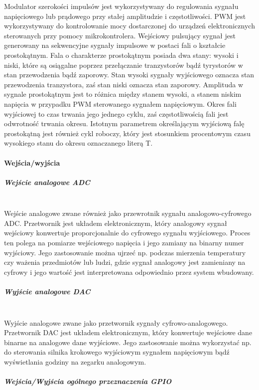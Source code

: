 \documentclass[12p]{article}
\begin{document}
Modulator szerokości impulsów jest wykorzystywany do regulowania sygnału napięciowego lub prądowego przy stałej amplitudzie i częstotliwości. PWM jest wykorzystywany do kontrolowanie mocy dostarczonej do urządzeń elektronicznych sterowanych przy pomocy mikrokontrolera. Wejściowy pulsujący sygnał jest generowany na sekwencyjne sygnały impulsowe w postaci fali o kształcie prostokątnym. Fala o charakterze prostokątnym posiada dwa stany: wysoki i niski, które są osiągalne poprzez przełączanie tranzystorów bądź tyrystorów w stan przewodzenia bądź zaporowy. Stan wysoki sygnały wyjściowego oznacza stan przewodzenia tranzystora, zaś stan niski oznacza stan zaporowy. Amplituda w sygnale prostokątnym jest to różnica między stanem wysoki, a stanem niskim napięcia w przypadku PWM sterowanego sygnałem napięciowym. Okres fali wyjściowej to czas trwania jego jednego cyklu, zaś częstotliwością fali jest odwrotność trwania okresu. Istotnym parametrem określającym wyjściową falę prostokątną jest również cykl roboczy, który jest stosunkiem procentowym czasu wysokiego stanu do okresu oznaczanego literą T.

\paragraph{Wejścia/wyjścia}
\subparagraph{Wejście analogowe ADC} \mbox{} \\

Wejście analogowe zwane również jako przewrotnik sygnału analogowo-cyfrowego ADC. Przetwornik jest układem elektronicznym, który analogowy sygnał wejściowy konwertuje proporcjonalnie do cyfrowego sygnału wyjściowego. Proces ten polega na pomiarze wejściowego napięcia i jego zamiany na binarny numer wyjściowy. Jego zastosowanie można ujrzeć np. podczas mierzenia temperatury czy ważenia przedmiotów lub ludzi, gdzie sygnał analogowy jest zamieniany na cyfrowy i jego wartość jest interpretowana odpowiednio przez system wbudowany. 

\subparagraph{Wyjście analogowe DAC} \mbox{} \\

Wyjście analogowe zwane jako przetwornik sygnały cyfrowo-analogowego. Przetwornik DAC jest układem elektronicznym, który konwertuje wejściowe dane binarne na analogowe dane wyjściowe. Jego zastosowanie można wykorzystać np. do sterowania silnika krokowego wyjściowym sygnałem napięciowym bądź wyświetlania godziny na zegarku analogowym.

\subparagraph{Wejścia/Wyjścia ogólnego przeznaczenia GPIO} \mbox{} \\
\end{document}
